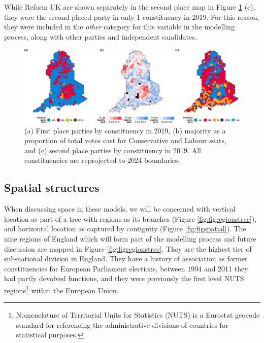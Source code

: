 \documentclass[webpdf,large,contemporary,namedate]{oup-authoring-template}
\theoremstyle{thmstyleone}
\theoremstyle{thmstyletwo}
\theoremstyle{thmstylethree}
\begin{document}
While Reform UK are shown separately in the second place map in Figure
\ref{fig:figplacement} (c), they were the second placed party in only 1
constituency in 2019. For this reason, they were included in the
\emph{other} category for this variable in the modelling process, along
with other parties and independent candidates.

\begin{figure}[th]
\includegraphics[width=1\linewidth]{jrss_resubmission_files/figure-latex/figplacement-1} \caption{(a) First place parties by constituency in 2019, (b) majority as a proportion of total votes cast for Conservative and Labour seats, and (c) second place parties by constituency in 2019. All constituencies are reprojected to 2024 boundaries.}\label{fig:figplacement}
\end{figure}

\subsection{Spatial structures}\label{spatial-structures}

When discussing space in these models, we will be concerned with
vertical location as part of a tree with regions as its branches (Figure
\ref{fig:figregionstree}), and horizontal location as captured by
contiguity (Figure \ref{fig:figspatial}). The nine regions of England
which will form part of the modelling process and future discussion are
mapped in Figure \ref{fig:figregionstree}. They are the highest tier of
sub-national division in England. They have a history of association as
former constituencies for European Parliament elections, between 1994
and 2011 they had partly devolved functions, and they were previously
the first level NUTS regions\footnote{Nomenclature of Territorial Units
  for Statistics (NUTS) is a Eurostat geocode standard for referencing
  the administrative divisions of countries for statistical purposes.}
within the European Union.
\end{document}
